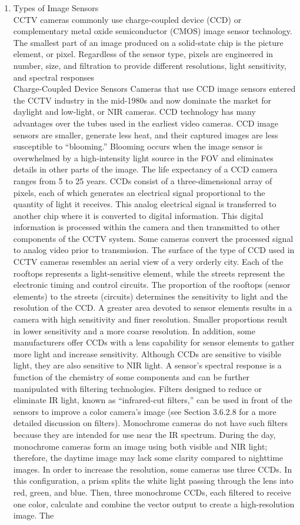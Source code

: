 \documentclass[12pt,fleqn]{book} %
\begin{document}
\begin{enumerate}
    \item Types of Image Sensors 
    \\CCTV cameras commonly use charge-coupled device (CCD) or complementary metal oxide semiconductor (CMOS) image sensor technology. The smallest part of an image produced on a solid-state chip is the picture element, or pixel. Regardless of the sensor type, pixels are engineered in number, size, and filtration to provide different resolutions, light sensitivity, and spectral responses
    \\Charge-Coupled Device Sensors Cameras that use CCD image sensors entered the CCTV industry in the mid-1980s and now dominate the market for daylight and low-light, or NIR cameras. CCD technology has many advantages over the tubes used in the earliest video cameras. CCD image sensors are smaller, generate less heat, and their captured images are less susceptible to “blooming.” Blooming occurs when the image sensor is overwhelmed by a high-intensity light source in the FOV and eliminates details in other parts of the image. The life expectancy of a CCD camera ranges from 5 to 25 years. CCDs consist of a three-dimensional array of pixels, each of which generates an electrical signal proportional to the quantity of light it receives. This analog electrical signal is transferred to another chip where it is converted to digital information. This digital information is processed within the camera and then transmitted to other components of the CCTV system. Some cameras convert the processed signal to analog video prior to transmission. The surface of the type of CCD used in CCTV cameras resembles an aerial view of a very orderly city. Each of the rooftops represents a light-sensitive element, while the streets represent the electronic timing and control circuits. The proportion of the rooftops (sensor elements) to the streets (circuits) determines the sensitivity to light and the resolution of the CCD. A greater area devoted to sensor elements results in a camera with high sensitivity and finer resolution. Smaller proportions result in lower sensitivity and a more coarse resolution. In addition, some manufacturers offer CCDs with a lens capability for sensor elements to gather more light and increase sensitivity. Although CCDs are sensitive to visible light, they are also sensitive to NIR light. A sensor’s spectral response is a function of the chemistry of some components and can be further manipulated with filtering technologies. Filters designed to reduce or eliminate IR light, known as “infrared-cut filters,” can be used in front of the sensors to improve a color camera’s image (see Section 3.6.2.8 for a more detailed discussion on filters). Monochrome cameras do not have such filters because they are intended for use near the IR spectrum. During the day, monochrome cameras form an image using both visible and NIR light; therefore, the daytime image may lack some clarity compared to nighttime images. In order to increase the resolution, some cameras use three CCDs. In this configuration, a prism splits the white light passing through the lens into red, green, and blue. Then, three monochrome CCDs, each filtered to receive one color, calculate and combine the vector output to create a high-resolution image. The 
\end{enumerate}
\end{document}
